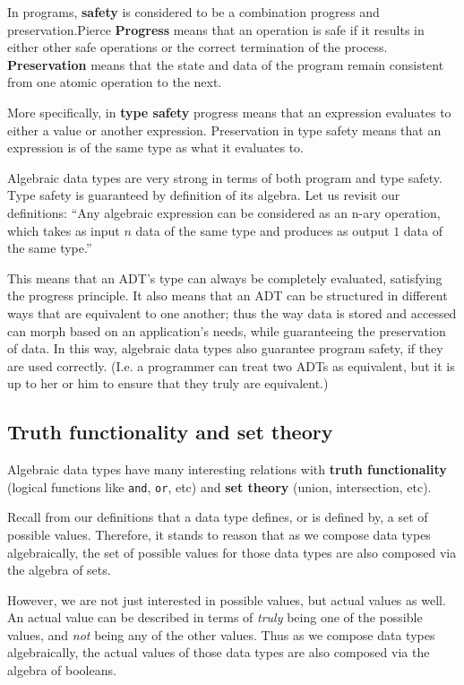 \documentclass[12pt,a4paper]{article}
\begin{document}
		In programs, \textbf{safety} is considered to be a combination progress and preservation.{Pierce} \textbf{Progress} means that an operation is safe if it results in either other safe operations or the correct termination of the process. \textbf{Preservation} means that the state and data of the program remain consistent from one atomic operation to the next.
		
		More specifically, in \textbf{type safety} progress means that an expression evaluates to either a value or another expression. Preservation in type safety means that an expression is of the same type as what it evaluates to.\cite{Pierce}
		
		Algebraic data types are very strong in terms of both program and type safety. Type safety is guaranteed by definition of its algebra. Let us revisit our definitions: \textquotedblleft Any algebraic expression can be considered as an n-ary operation, which takes as input $n$ data of the same type and produces as output $1$ data of the same type.\textquotedblright 
		
		This means that an ADT's type can always be completely evaluated, satisfying the progress principle. It also means that an ADT can be structured in different ways that are equivalent to one another; thus the way data is stored and accessed can morph based on an application's needs, while guaranteeing the preservation of data. In this way, algebraic data types also guarantee program safety, if they are used correctly. (I.e. a programmer can treat two ADTs as equivalent, but it is up to her or him to ensure that they truly are equivalent.)
		
		
		\subsection{Truth functionality and set theory}
		
		Algebraic data types have many interesting relations with \textbf{truth functionality} (logical functions like \texttt{and}, \texttt{or}, etc) and \textbf{set theory} (union, intersection, etc).
		
		Recall from our definitions that a data type defines, or is defined by, a set of possible values. Therefore, it stands to reason that as we compose data types algebraically, the set of possible values for those data types are also composed via the algebra of sets.
		
		However, we are not just interested in possible values, but actual values as well. An actual value can be described in terms of \textit{truly} being one of the possible values, and \textit{not} being any of the other values. Thus as we compose data types algebraically, the actual values of those data types are also composed via the algebra of booleans.
		
\end{document}
